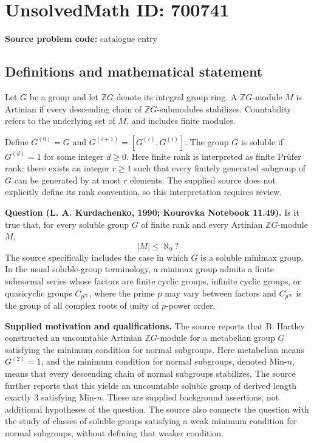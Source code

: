 \documentclass[11pt]{article}
\begin{document}
\section*{UnsolvedMath ID: 700741}
\textbf{Source problem code:} catalogue entry
\subsection{Definitions and mathematical statement}
Let \(G\) be a group and let \(\mathbb ZG\) denote its integral group ring. A \(\mathbb ZG\)-module \(M\) is Artinian if every descending chain of \(\mathbb ZG\)-submodules stabilizes. Countability refers to the underlying set of \(M\), and includes finite modules.

Define \(G^{(0)}=G\) and \(G^{(i+1)}=[G^{(i)},G^{(i)}]\). The group \(G\) is soluble if \(G^{(d)}=1\) for some integer \(d\geq 0\). Here finite rank is interpreted as finite Pr\"ufer rank: there exists an integer \(r\geq 1\) such that every finitely generated subgroup of \(G\) can be generated by at most \(r\) elements. The supplied source does not explicitly define its rank convention, so this interpretation requires review.

\textbf{Question (L. A. Kurdachenko, 1990; Kourovka Notebook 11.49).} Is it true that, for every soluble group \(G\) of finite rank and every Artinian \(\mathbb ZG\)-module \(M\),
\[
|M|\leq\aleph_0?
\]
The source specifically includes the case in which \(G\) is a soluble minimax group. In the usual soluble-group terminology, a minimax group admits a finite subnormal series whose factors are finite cyclic groups, infinite cyclic groups, or quasicyclic groups \(C_{p^\infty}\), where the prime \(p\) may vary between factors and \(C_{p^\infty}\) is the group of all complex roots of unity of \(p\)-power order.

\textbf{Supplied motivation and qualifications.} The source reports that B. Hartley constructed an uncountable Artinian \(\mathbb ZG\)-module for a metabelian group \(G\) satisfying the minimum condition for normal subgroups. Here metabelian means \(G^{(2)}=1\), and the minimum condition for normal subgroups, denoted \(\mathrm{Min}\text{-}n\), means that every descending chain of normal subgroups stabilizes. The source further reports that this yields an uncountable soluble group of derived length exactly \(3\) satisfying \(\mathrm{Min}\text{-}n\). These are supplied background assertions, not additional hypotheses of the question. The source also connects the question with the study of classes of soluble groups satisfying a weak minimum condition for normal subgroups, without defining that weaker condition.
\end{document}
